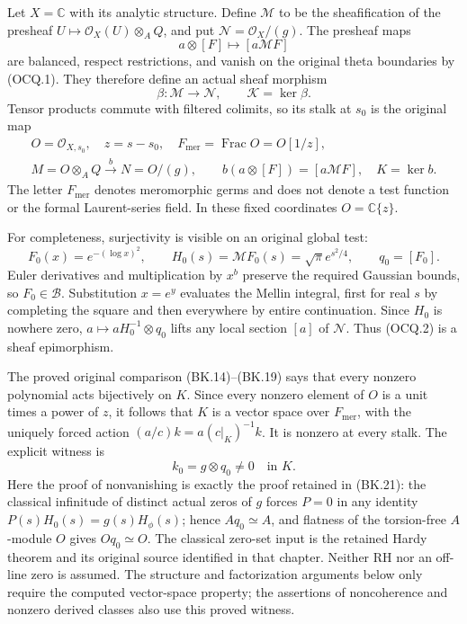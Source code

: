 Let $X=\mathbb C$ with its analytic structure.  Define $\mathcal M$ to
be the sheafification of the presheaf
$U\mapsto\mathcal O_X(U)\otimes_AQ$, and put
$\mathcal N=\mathcal O_X/(g)$.  The presheaf maps
\[
 a\otimes[F]\longmapsto [a\mathcal MF]
\]
are balanced, respect restrictions, and vanish on the original theta
boundaries by (OCQ.1).  They therefore define an actual sheaf morphism
\[
 \beta:\mathcal M\longrightarrow\mathcal N,
 \qquad\mathcal K=\ker\beta.                                  \tag{OCQ.2}
\]
Tensor products commute with filtered colimits, so its stalk at $s_0$ is
the original map
\[
 \begin{gathered}
 O=\mathcal O_{X,s_0},\quad z=s-s_0,\quad
 F_{\mathrm{mer}}=\operatorname{Frac}O=O[1/z],\\
 M=O\otimes_AQ\xrightarrow{\ b\ }N=O/(g),\qquad
 b(a\otimes[F])=[a\mathcal MF],\quad K=\ker b.
 \end{gathered}                                               \tag{OCQ.3}
\]
The letter $F_{\mathrm{mer}}$ denotes meromorphic germs and does not
denote a test function or the formal Laurent-series field.
In these fixed coordinates $O=\mathbb C\{z\}$.

For completeness, surjectivity is visible on an original global test:
\[
 F_0(x)=e^{-(\log x)^2},\qquad
 H_0(s)=\mathcal MF_0(s)=\sqrt\pi e^{s^2/4},\qquad q_0=[F_0].
                                                                    \tag{OCQ.4}
\]
Euler derivatives and multiplication by $x^b$ preserve the required
Gaussian bounds, so $F_0\in\mathscr B$.  Substitution $x=e^y$ evaluates
the Mellin integral, first for real $s$ by completing the square and then
everywhere by entire continuation.  Since $H_0$ is nowhere zero,
$a\mapsto aH_0^{-1}\otimes q_0$ lifts any local section $[a]$ of
$\mathcal N$.  Thus (OCQ.2) is a sheaf epimorphism.

The proved original comparison (BK.14)--(BK.19) says that every nonzero
polynomial acts bijectively on $K$.  Since every nonzero element of $O$
is a unit times a power of $z$, it follows that $K$ is a vector space
over $F_{\mathrm{mer}}$, with the uniquely forced action
$(a/c)k=a(c|_K)^{-1}k$.
It is nonzero at every stalk.  The explicit witness is
\[
 k_0=g\otimes q_0\ne0\quad\text{in }K.                         \tag{OCQ.5}
\]
Here the proof of nonvanishing is exactly the proof retained in
(BK.21): the classical infinitude of distinct actual zeros of $g$
forces $P=0$ in any identity $P(s)H_0(s)=g(s)H_\phi(s)$; hence
$Aq_0\simeq A$, and flatness of the torsion-free $A$-module $O$ gives
$Oq_0\simeq O$.  The classical zero-set input is the retained Hardy
theorem and its original source identified in that chapter.  Neither
RH nor an off-line zero is assumed.  The structure and factorization
arguments below only require the computed vector-space property;
the assertions of noncoherence and nonzero derived classes also use
this proved witness.


